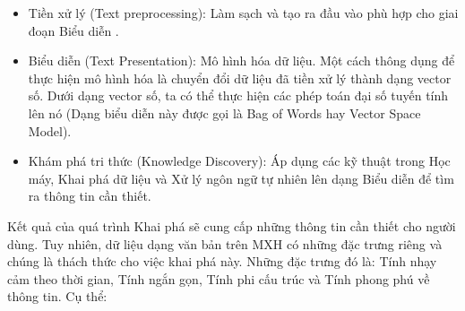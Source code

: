 \documentclass[12pt]{extarticle}
\begin{document}
			\begin{itemize}
				\item Tiền xử lý (Text preprocessing): Làm sạch và tạo ra đầu vào phù hợp cho giai đoạn Biểu diễn .
				\item Biểu diễn (Text Presentation): Mô hình hóa dữ liệu. Một cách thông dụng để thực hiện mô hình hóa là chuyển đổi dữ liệu đã tiền xử lý thành dạng vector số. Dưới dạng vector số, ta có thể thực hiện các phép toán đại số tuyến tính lên nó (Dạng biểu diễn này được gọi là Bag of Words hay Vector Space Model).
				\item Khám phá tri thức (Knowledge Discovery): Áp dụng các kỹ thuật trong Học máy, Khai phá dữ liệu và Xử lý ngôn ngữ tự nhiên lên dạng Biểu diễn để tìm ra thông tin cần thiết.
			\end{itemize}
			\par Kết quả của quá trình Khai phá sẽ cung cấp những thông tin cần thiết cho người dùng. Tuy nhiên, dữ liệu dạng văn bản trên MXH có những đặc trưng riêng và chúng là thách thức cho việc khai phá này. Những đặc trưng đó là: Tính nhạy cảm theo thời gian, Tính ngắn gọn, Tính phi cấu trúc và Tính phong phú về thông tin. Cụ thể:
\end{document}
